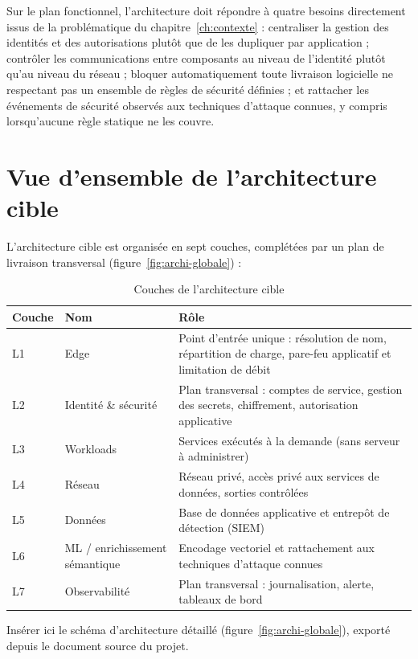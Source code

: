 Sur le plan fonctionnel, l'architecture doit répondre à quatre besoins directement issus de
la problématique du chapitre~\ref{ch:contexte} : centraliser la gestion des identités et des
autorisations plutôt que de les dupliquer par application ; contrôler les communications
entre composants au niveau de l'identité plutôt qu'au niveau du réseau ; bloquer
automatiquement toute livraison logicielle ne respectant pas un ensemble de règles de
sécurité définies ; et rattacher les événements de sécurité observés aux techniques
d'attaque connues, y compris lorsqu'aucune règle statique ne les couvre.

\section{Vue d'ensemble de l'architecture cible}

L'architecture cible est organisée en sept couches, complétées par un plan de livraison
transversal (figure~\ref{fig:archi-globale}) :

\begin{table}[htbp]
\centering
\caption{Couches de l'architecture cible}
\label{tab:couches-archi}
\begin{tabular}{@{}P{1.2cm}P{3.3cm}P{9cm}@{}}
\toprule
\textbf{Couche} & \textbf{Nom} & \textbf{Rôle} \\
\midrule
L1 & Edge & Point d'entrée unique : résolution de nom, répartition de charge, pare-feu
applicatif et limitation de débit \\
L2 & Identité \& sécurité & Plan transversal : comptes de service, gestion des secrets,
chiffrement, autorisation applicative \\
L3 & Workloads & Services exécutés à la demande (sans serveur à administrer) \\
L4 & Réseau & Réseau privé, accès privé aux services de données, sorties contrôlées \\
L5 & Données & Base de données applicative et entrepôt de détection (SIEM) \\
L6 & ML / enrichissement sémantique & Encodage vectoriel et rattachement aux techniques
d'attaque connues \\
L7 & Observabilité & Plan transversal : journalisation, alerte, tableaux de bord \\
\bottomrule
\end{tabular}
\end{table}

\begin{attentedoc}
Insérer ici le schéma d'architecture détaillé (figure~\ref{fig:archi-globale}), exporté
depuis le document source du projet.
\end{attentedoc}

